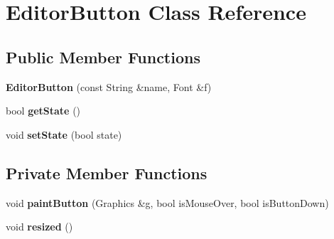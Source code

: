 \hypertarget{classEditorButton}{\section{Editor\-Button Class Reference}
\label{classEditorButton}
}
\subsection*{Public Member Functions}
\begin{DoxyCompactItemize}
\item 
\hypertarget{classEditorButton_a35ec700d47c757da0bf5f2bd29103ade}{{\bfseries Editor\-Button} (const String \&name, Font \&f)}\label{classEditorButton_a35ec700d47c757da0bf5f2bd29103ade}

\item 
\hypertarget{classEditorButton_a59b8c7d8aaecbf1284dd0984ea38db1e}{bool {\bfseries get\-State} ()}\label{classEditorButton_a59b8c7d8aaecbf1284dd0984ea38db1e}

\item 
\hypertarget{classEditorButton_a214cdec9d7b55f60c1bcbf1ba9c66067}{void {\bfseries set\-State} (bool state)}\label{classEditorButton_a214cdec9d7b55f60c1bcbf1ba9c66067}

\end{DoxyCompactItemize}
\subsection*{Private Member Functions}
\begin{DoxyCompactItemize}
\item 
\hypertarget{classEditorButton_a1c1cdda922d62e682dce7389372a8ba4}{void {\bfseries paint\-Button} (Graphics \&g, bool is\-Mouse\-Over, bool is\-Button\-Down)}\label{classEditorButton_a1c1cdda922d62e682dce7389372a8ba4}

\item 
\hypertarget{classEditorButton_a6e3c89fb005ae8a45282730781504afe}{void {\bfseries resized} ()}\label{classEditorButton_a6e3c89fb005ae8a45282730781504afe}

\end{DoxyCompactItemize}
